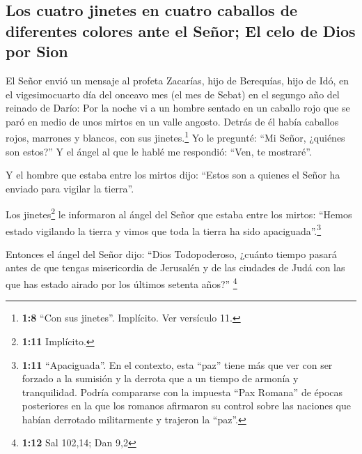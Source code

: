 \hypertarget{los-cuatro-jinetes-en-cuatro-caballos-de-diferentes-colores-ante-el-seuxf1or-el-celo-de-dios-por-sion}{%
\subsection{Los cuatro jinetes en cuatro caballos de diferentes colores
ante el Señor; El celo de Dios por
Sion}\label{los-cuatro-jinetes-en-cuatro-caballos-de-diferentes-colores-ante-el-seuxf1or-el-celo-de-dios-por-sion}}

 El Señor envió un mensaje al profeta Zacarías, hijo de
Berequías, hijo de Idó, en el vigesimocuarto día del onceavo mes (el mes
de Sebat) en el segungo año del reinado de Darío:  Por la
noche vi a un hombre sentado en un caballo rojo que se paró en medio de
unos mirtos en un valle angosto. Detrás de él había caballos rojos,
marrones y blancos, con sus jinetes.\footnote{\textbf{1:8} ``Con sus
  jinetes''. Implícito. Ver versículo 11.}  Yo le
pregunté: ``Mi Señor, ¿quiénes son estos?'' Y el ángel al que le hablé
me respondió: ``Ven, te mostraré''.

 Y el hombre que estaba entre los mirtos dijo: ``Estos
son a quienes el Señor ha enviado para vigilar la tierra''.

 Los jinetes\footnote{\textbf{1:11} Implícito.} le
informaron al ángel del Señor que estaba entre los mirtos: ``Hemos
estado vigilando la tierra y vimos que toda la tierra ha sido
apaciguada''.\footnote{\textbf{1:11} ``Apaciguada''. En el contexto,
  esta ``paz'' tiene más que ver con ser forzado a la sumisión y la
  derrota que a un tiempo de armonía y tranquilidad. Podría compararse
  con la impuesta ``Pax Romana'' de épocas posteriores en la que los
  romanos afirmaron su control sobre las naciones que habían derrotado
  militarmente y trajeron la ``paz''.}

 Entonces el ángel del Señor dijo: ``Dios Todopoderoso,
¿cuánto tiempo pasará antes de que tengas misericordia de Jerusalén y de
las ciudades de Judá con las que has estado airado por los últimos
setenta años?'' \footnote{\textbf{1:12} Sal 102,14; Dan 9,2}

